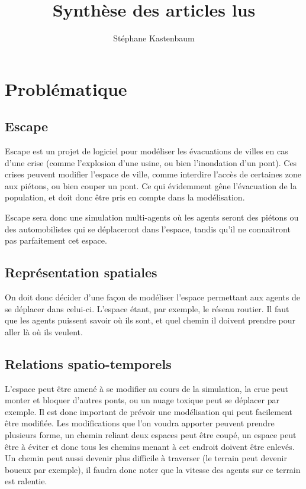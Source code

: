\documentclass[a4paper]{article}
\title{Synthèse des articles lus}
\author{Stéphane Kastenbaum}
\begin{document}
\maketitle

\section{Problématique}
\subsection{Escape}

Escape est un projet de logiciel pour modéliser les évacuations de villes en cas
d'une crise (comme l'explosion d'une usine, ou bien l'inondation d'un pont).
Ces crises peuvent modifier l'espace de ville, comme interdire l'accès de
certaines zone aux piétons, ou bien couper un pont. Ce qui évidemment gêne
l'évacuation de la population, et doit donc être pris en compte dans la
modélisation.

Escape sera donc une simulation multi-agents où les agents seront des piétons
ou des automobilistes qui se déplaceront dans l'espace, tandis qu'il ne
connaitront pas parfaitement cet espace.

\subsection{Représentation spatiales}

On doit donc décider d'une façon de modéliser l'espace permettant aux agents de
se déplacer dans celui-ci. L'espace étant, par exemple, le réseau routier. Il
faut que les agents puissent savoir où ils sont, et quel chemin il doivent
prendre pour aller là où ils veulent.

\subsection{Relations spatio-temporels}

L'espace peut être amené à se modifier au cours de la simulation, la crue peut
monter et bloquer d'autres ponts, ou un nuage toxique peut se déplacer par
exemple. Il est donc important de prévoir une modélisation qui peut facilement
être modifiée. Les modifications que l'on voudra apporter peuvent prendre
plusieurs forme, un chemin reliant deux espaces peut être coupé, un espace
peut être à éviter et donc tous les chemins menant à cet endroit doivent être
enlevés. Un chemin peut aussi devenir plus difficile à traverser (le terrain
peut devenir boueux par exemple), il faudra donc noter que la vitesse des agents
sur ce terrain est ralentie.
\end{document}

